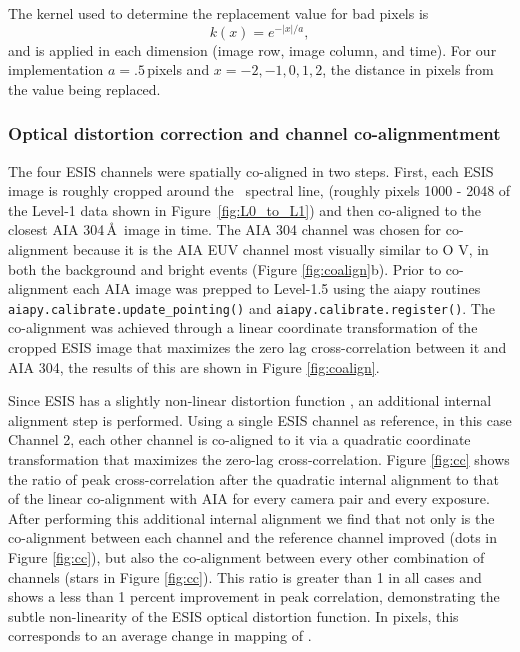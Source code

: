         The kernel used to determine the replacement value for bad pixels is
		\begin{equation} \label{eq:despike_kernel}
		    k(x) = e^{-|x|/a},
		\end{equation}
	    and is applied in each dimension (image row, image column, and time).
        For our implementation $a=.5$\,pixels and $x= -2, -1, 0, 1 , 2$, the distance in pixels from the value being replaced.  
        
        
    \subsubsection{Optical distortion correction and channel co-alignmentment}
   		
   	    The four ESIS channels were spatially co-aligned in two steps.
        First, each ESIS image is roughly cropped around the \ov \ spectral line, (roughly pixels 1000 - 2048 of the Level-1 data shown in Figure~\ref{fig:L0_to_L1}) and then co-aligned to the closest AIA 304\,\AA\ image in time.  
        The AIA 304 channel was chosen for co-alignment because it is the AIA EUV channel most visually similar to O V, in both the background and bright events (Figure \ref{fig:coalign}b).
        Prior to co-alignment each AIA image was prepped to Level-1.5 using the aiapy routines \texttt{aiapy.calibrate.update\_pointing()} and \texttt{aiapy.calibrate.register()}.
        The co-alignment was achieved through a linear coordinate transformation of the cropped ESIS image that maximizes the zero lag cross-correlation between it and AIA 304, the results of this are shown in Figure \ref{fig:coalign}.
        
    	Since ESIS has a slightly non-linear distortion function \citep{ESIS}, an additional internal alignment step is performed.
    	Using a single ESIS channel as reference, in this case Channel 2, each other channel is co-aligned to it via a quadratic coordinate transformation that maximizes the zero-lag cross-correlation. 
    	Figure \ref{fig:cc} shows the ratio of peak cross-correlation after the quadratic internal alignment to that of the linear co-alignment with AIA for every camera pair and every exposure.
    	After performing this additional internal alignment we find that not only is the co-alignment between each channel and the reference channel improved (dots in Figure \ref{fig:cc}), but also the co-alignment between every other combination of channels (stars in Figure \ref{fig:cc}).
    	This ratio is greater than 1 in all cases and shows a less than 1 percent improvement in peak correlation, demonstrating the subtle non-linearity of the ESIS optical distortion function.
    	In pixels, this corresponds to an average change in mapping of .
    	

